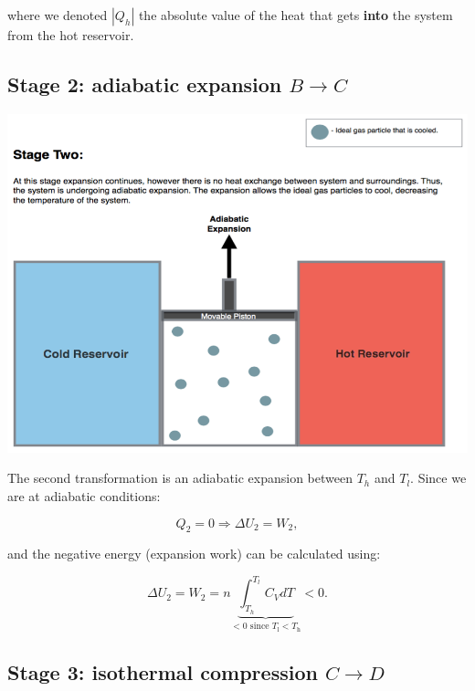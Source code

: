 \documentclass[
  9pt,
]{extbook}
\theoremstyle{definition}
\theoremstyle{definition}
\theoremstyle{definition}
\theoremstyle{remark}
\begin{document}
where we denoted \(\left| Q_h \right|\) the absolute value of the heat that gets \textbf{into} the system from the hot reservoir.

\hypertarget{CCstage2}{%
\subsection{\texorpdfstring{Stage 2: adiabatic expansion \(B \rightarrow C\)}{Stage 2: adiabatic expansion B \textbackslash rightarrow C}}\label{CCstage2}}

\begin{center}\includegraphics[width=0.7\linewidth]{./img/OEP_Figures.007b} \end{center}

The second transformation is an adiabatic expansion between \(T_h\) and \(T_l\). Since we are at adiabatic conditions:

\begin{equation}
Q_2 = 0 \Rightarrow \Delta U_2 = W_2,
  \label{eq:CCst2}
\end{equation}

and the negative energy (expansion work) can be calculated using:

\begin{equation}
\Delta U_2 = W_2 = n \underbrace{\int_{T_h}^{T_l} C_V dT}_{<0 \text{ since } T_\mathrm{l}<T_\mathrm{h}} < 0.
  \label{eq:CCst2b}
\end{equation}

\hypertarget{CCstage3}{%
\subsection{\texorpdfstring{Stage 3: isothermal compression \(C \rightarrow D\)}{Stage 3: isothermal compression C \textbackslash rightarrow D}}\label{CCstage3}}
\end{document}
